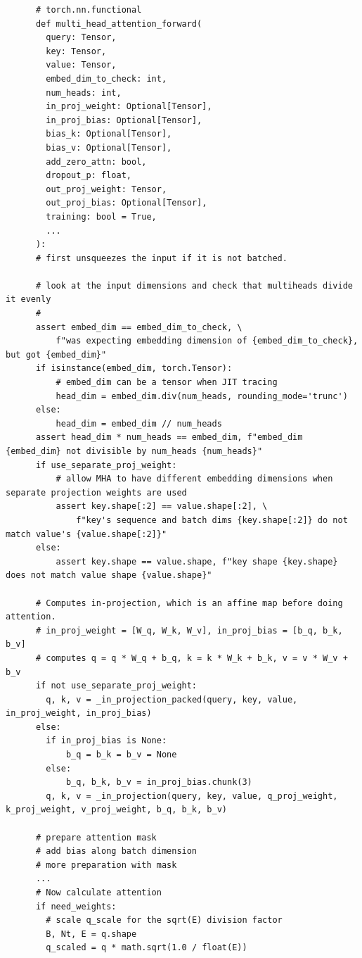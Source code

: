 \documentclass{article}
\begin{document}
    \begin{lstlisting}
      # torch.nn.functional 
      def multi_head_attention_forward(
        query: Tensor,
        key: Tensor,
        value: Tensor,
        embed_dim_to_check: int,
        num_heads: int,
        in_proj_weight: Optional[Tensor],
        in_proj_bias: Optional[Tensor],
        bias_k: Optional[Tensor],
        bias_v: Optional[Tensor],
        add_zero_attn: bool,
        dropout_p: float,
        out_proj_weight: Tensor,
        out_proj_bias: Optional[Tensor],
        training: bool = True,
        ...
      ): 
      # first unsqueezes the input if it is not batched. 

      # look at the input dimensions and check that multiheads divide it evenly 
      #  
      assert embed_dim == embed_dim_to_check, \
          f"was expecting embedding dimension of {embed_dim_to_check}, but got {embed_dim}"
      if isinstance(embed_dim, torch.Tensor):
          # embed_dim can be a tensor when JIT tracing
          head_dim = embed_dim.div(num_heads, rounding_mode='trunc')
      else:
          head_dim = embed_dim // num_heads
      assert head_dim * num_heads == embed_dim, f"embed_dim {embed_dim} not divisible by num_heads {num_heads}"
      if use_separate_proj_weight:
          # allow MHA to have different embedding dimensions when separate projection weights are used
          assert key.shape[:2] == value.shape[:2], \
              f"key's sequence and batch dims {key.shape[:2]} do not match value's {value.shape[:2]}"
      else:
          assert key.shape == value.shape, f"key shape {key.shape} does not match value shape {value.shape}"

      # Computes in-projection, which is an affine map before doing attention. 
      # in_proj_weight = [W_q, W_k, W_v], in_proj_bias = [b_q, b_k, b_v] 
      # computes q = q * W_q + b_q, k = k * W_k + b_k, v = v * W_v + b_v
      if not use_separate_proj_weight:
        q, k, v = _in_projection_packed(query, key, value, in_proj_weight, in_proj_bias)
      else:
        if in_proj_bias is None:
            b_q = b_k = b_v = None
        else:
            b_q, b_k, b_v = in_proj_bias.chunk(3)
        q, k, v = _in_projection(query, key, value, q_proj_weight, k_proj_weight, v_proj_weight, b_q, b_k, b_v)

      # prepare attention mask 
      # add bias along batch dimension  
      # more preparation with mask
      ... 
      # Now calculate attention
      if need_weights:
        # scale q_scale for the sqrt(E) division factor 
        B, Nt, E = q.shape
        q_scaled = q * math.sqrt(1.0 / float(E))


\end{lstlisting}
\end{document}
